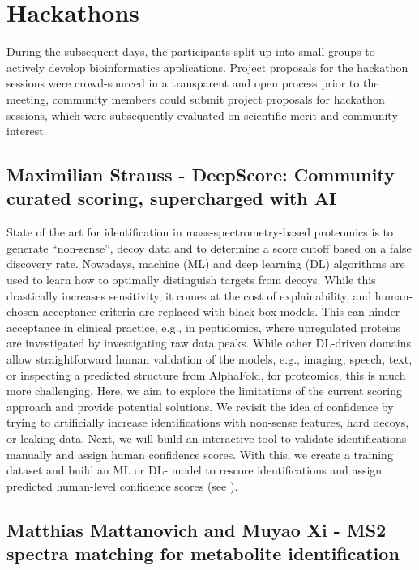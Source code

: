 \section{Hackathons}

During the subsequent days, the participants split up into small groups to actively develop bioinformatics applications. Project proposals for the hackathon sessions were crowd-sourced in a transparent and open process \citep{EuBIC2023GitHub} prior to the meeting, community members could submit project proposals for hackathon sessions, which were subsequently evaluated on scientific merit and community interest.


\subsection{Maximilian Strauss - DeepScore: Community curated scoring, supercharged with AI}

State of the art for identification in mass-spectrometry-based proteomics is to generate “non-sense”, decoy data and to determine a score cutoff based on a false discovery rate. Nowadays, machine (ML) and deep learning (DL) algorithms are used to learn how to optimally distinguish targets from decoys. While this drastically increases sensitivity, it comes at the cost of explainability, and human-chosen acceptance criteria are replaced with black-box models. This can hinder acceptance in clinical practice, e.g., in peptidomics, where upregulated proteins are investigated by investigating raw data peaks. While other DL-driven domains allow straightforward human validation of the models, e.g., imaging, speech, text, or inspecting a predicted structure from AlphaFold, for proteomics, this is much more challenging. Here, we aim to explore the limitations of the current scoring approach and provide potential solutions. We revisit the idea of confidence by trying to artificially increase identifications with non-sense features, hard decoys, or leaking data. Next, we will build an interactive tool to validate identifications manually and assign human confidence scores. With this, we create a training dataset and build an ML or DL- model to rescore identifications and assign predicted human-level confidence scores (see \citep{issue14}).


\subsection{Matthias Mattanovich and Muyao Xi - MS2 spectra matching for metabolite identification}

